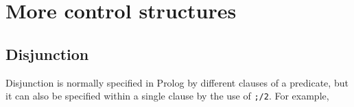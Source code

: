 %
%
%

\section{More control structures}
    \subsection{Disjunction}
 
Disjunction is normally specified in Prolog by different clauses of
a predicate, but it can also be specified within a single clause by
the use of \verb';/2'. For example,

